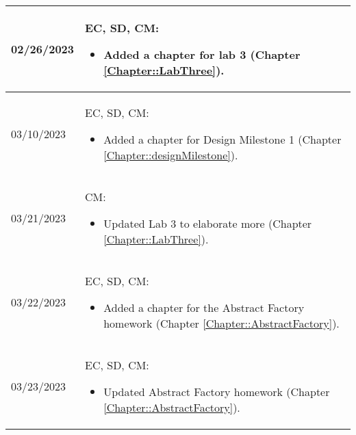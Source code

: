 \begin{longtable}{|l||p{13.5cm}|}
	02/26/2023    & EC, SD, CM:
	\begin{itemize}[topsep=0pt,itemsep=0pt,parsep=0pt,partopsep=0pt,leftmargin=12pt]
		\item Added a chapter for lab 3 (Chapter \ref{Chapter::LabThree}).
	\end{itemize}
	\\ \hline
	03/10/2023    & EC, SD, CM:
	\begin{itemize}[topsep=0pt,itemsep=0pt,parsep=0pt,partopsep=0pt,leftmargin=12pt]
		\item Added a chapter for Design Milestone 1 (Chapter \ref{Chapter::designMilestone}).
	\end{itemize}
	\\ \hline
	03/21/2023    & CM:
	\begin{itemize}[topsep=0pt,itemsep=0pt,parsep=0pt,partopsep=0pt,leftmargin=12pt]
		\item Updated Lab 3 to elaborate more (Chapter \ref{Chapter::LabThree}).
	\end{itemize}
	\\ \hline

	03/22/2023    & EC, SD, CM:
	\begin{itemize}[topsep=0pt,itemsep=0pt,parsep=0pt,partopsep=0pt,leftmargin=12pt]
		\item Added a chapter for the Abstract Factory homework (Chapter \ref{Chapter::AbstractFactory}).
	\end{itemize}
	\\ \hline

	03/23/2023    & EC, SD, CM:
	\begin{itemize}[topsep=0pt,itemsep=0pt,parsep=0pt,partopsep=0pt,leftmargin=12pt]
		\item Updated Abstract Factory homework (Chapter \ref{Chapter::AbstractFactory}).
	\end{itemize}
	\\ \hline
\end{longtable}